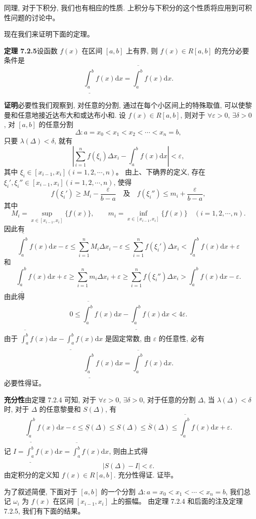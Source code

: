 \documentclass[UTF8, 12pt, fontset=fandol, oneside]{ctexart}
\begin{document}
同理, 对于下积分, 我们也有相应的性质. 上积分与下积分的这个性质将应用到可积性问题的讨论中。

现在我们来证明下面的定理。

\noindent\textbf{定理 7.2.5}\quad 设函数 $f(x)$ 在区间 $[a,b]$ 上有界, 则 $f(x)\in R[a,b]$ 的充分必要条件是
\[
  \underline{\int_a^b} f(x)\mathrm dx=\overline{\int_a^b} f(x)\mathrm dx.
\]

\noindent\textbf{证明}\quad 必要性\quad 我们观察到, 对任意的分割, 通过在每个小区间上的特殊取值, 可以使黎曼和任意地接近达布大和或达布小和. 设 $f(x)\in R[a,b]$, 则对于 $\forall\varepsilon>0$, $\exists\delta>0$, 对 $[a,b]$ 的任意分割
\[
  \Delta:a=x_0<x_1<x_2<\cdots<x_n=b,
\]
只要 $\lambda(\Delta)<\delta$, 就有
\[
  \left|\sum_{i=1}^n f(\xi_i)\Delta x_i-\int_a^b f(x)\mathrm dx\right|<\varepsilon,
\]
其中 $\xi_i\in[x_{i-1},x_i](i=1,2,\cdots,n)$。
由上、下确界的定义, 存在 $\xi_i',\xi_i''\in[x_{i-1},x_i](i=1,2,\cdots,n)$, 使得
\[
  f(\xi_i')\geq M_i-\frac{\varepsilon}{b-a}\quad\text{及}\quad f(\xi_i'')\leq m_i+\frac{\varepsilon}{b-a},
\]
其中
\[
  M_i=\sup_{x\in[x_{i-1},x_i]}\{f(x)\},\qquad
  m_i=\inf_{x\in[x_{i-1},x_i]}\{f(x)\}\quad(i=1,2,\cdots,n).
\]
因此有
\[
  \overline{\int_a^b} f(x)\mathrm dx-\varepsilon
  \leq \sum_{i=1}^n M_i\Delta x_i-\varepsilon
  \leq \sum_{i=1}^n f(\xi_i')\Delta x_i
  < \int_a^b f(x)\mathrm dx+\varepsilon
\]
和
\[
  \underline{\int_a^b} f(x)\mathrm dx+\varepsilon
  \geq \sum_{i=1}^n m_i\Delta x_i+\varepsilon
  \geq \sum_{i=1}^n f(\xi_i'')\Delta x_i
  > \int_a^b f(x)\mathrm dx-\varepsilon.
\]
由此得
\[
  0\leq \overline{\int_a^b} f(x)\mathrm dx-\underline{\int_a^b} f(x)\mathrm dx<4\varepsilon.
\]
由于 $\overline{\int_a^b} f(x)\mathrm dx-\underline{\int_a^b} f(x)\mathrm dx$ 是固定常数, 由 $\varepsilon$ 的任意性, 必有
\[
  \underline{\int_a^b} f(x)\mathrm dx=\overline{\int_a^b} f(x)\mathrm dx.
\]
必要性得证。

\noindent\textbf{充分性}\quad 由定理 7.2.4 可知, 对于 $\forall\varepsilon>0$, $\exists\delta>0$, 对于任意的分割 $\Delta$, 当 $\lambda(\Delta)<\delta$ 时, 对于 $\Delta$ 的任意黎曼和 $S(\Delta)$, 有
\[
  \underline{\int_a^b} f(x)\mathrm dx-\varepsilon
  \leq \underline S(\Delta)\leq S(\Delta)\leq \overline S(\Delta)
  \leq \overline{\int_a^b} f(x)\mathrm dx+\varepsilon.
\]
记 $I=\underline{\int_a^b} f(x)\mathrm dx=\overline{\int_a^b} f(x)\mathrm dx$, 则由上式得
\[
  |S(\Delta)-I|<\varepsilon.
\]
由定积分的定义知 $f(x)\in R[a,b]$. 充分性得证. 证毕。

为了叙述简便, 下面对于 $[a,b]$ 的一个分割 $\Delta:a=x_0<x_1<\cdots<x_n=b$, 我们总记 $\omega_i$ 为 $f(x)$ 在区间 $[x_{i-1},x_i]$ 上的振幅。
由定理 7.2.4 和后面的注及定理 7.2.5, 我们有下面的结果。
\end{document}
